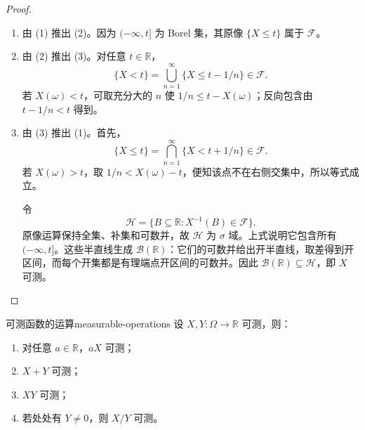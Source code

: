\begin{proof}
\begin{enumerate}
\item 由 (1) 推出 (2)。因为 $(-\infty,t]$ 为 Borel 集，其原像 $\{X\leq t\}$ 属于 $\mathcal F$。
\item 由 (2) 推出 (3)。对任意 $t\in\mathbb R$，
\[
\{X<t\}=\bigcup_{n=1}^{\infty}\{X\leq t-1/n\}\in\mathcal F.
\]
若 $X(\omega)<t$，可取充分大的 $n$ 使 $1/n\leq t-X(\omega)$；反向包含由 $t-1/n<t$ 得到。
\item 由 (3) 推出 (1)。首先，
\[
\{X\leq t\}=\bigcap_{n=1}^{\infty}\{X<t+1/n\}\in\mathcal F.
\]
若 $X(\omega)>t$，取 $1/n<X(\omega)-t$，便知该点不在右侧交集中，所以等式成立。

令
\[
\mathcal H=\{B\subseteq\mathbb R:X^{-1}(B)\in\mathcal F\}.
\]
原像运算保持全集、补集和可数并，故 $\mathcal H$ 为 $\sigma$ 域。上式说明它包含所有 $(-\infty,t]$。这些半直线生成 $\mathcal B(\mathbb R)$：它们的可数并给出开半直线，取差得到开区间，而每个开集都是有理端点开区间的可数并。因此 $\mathcal B(\mathbb R)\subseteq\mathcal H$，即 $X$ 可测。
\end{enumerate}
\end{proof}

\begin{proposition}{可测函数的运算}{measurable-operations}
设 $X,Y:\Omega\to\mathbb R$ 可测，则：
\begin{enumerate}
\item 对任意 $a\in\mathbb R$，$aX$ 可测；
\item $X+Y$ 可测；
\item $XY$ 可测；
\item 若处处有 $Y\ne0$，则 $X/Y$ 可测。
\end{enumerate}
\end{proposition}

